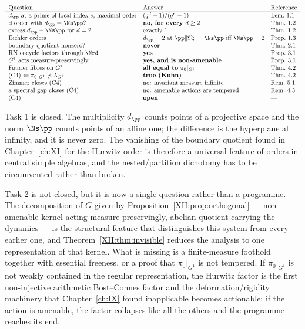 \[
\begin{array}{lll}
\text{Question} & \text{Answer} & \text{Reference}\\\hline
d_\pp\ \text{at a prime of local index }e\text{, maximal order} & (q^d-1)/(q^e-1) & \text{Lem.~1.1}\\
\exists\ \text{order with}\ d_\pp=\Ns\pp? & \textbf{no, for every }d\ge2 & \text{Thm.~1.2}\\
\text{excess}\ d_\pp-\Ns\pp\ \text{for}\ d=2 & \text{exactly }1 & \text{Thm.~1.2}\\
\text{Eichler orders} & d_\pp=2\ \text{at}\ \pp\|\mathfrak N;\ =\Ns\pp\ \text{iff}\ \Ns\pp=2 & \text{Prop.~1.3}\\
\text{boundary quotient nonzero?} & \textbf{never} & \text{Thm.~2.1}\\
\text{RN cocycle factors through}\ \Nrd & \textbf{yes} & \text{Prop.~3.1}\\
G^1\ \text{acts measure-preservingly} & \textbf{yes, and is non-amenable} & \text{Prop.~3.1}\\
\text{Fourier fibres on}\ G^1 & \textbf{all equal to}\ \pi_0|_{G^1} & \text{Thm.~4.2}\\
\text{(C4)}\Leftarrow\pi_0|_{G^1}\not\prec\lambda_{G^1} & \textbf{true (Kuhn)} & \text{Thm.~4.2}\\
\text{Zimmer closes (C4)} & \text{no: invariant measure infinite} & \text{Rem.~5.1}\\
\text{a spectral gap closes (C4)} & \text{no: amenable actions are tempered} & \text{Rem.~4.3}\\
\text{(C4)} & \textbf{open} & \text{---}
\end{array}
\]

Task 1 is closed. The multiplicity $d_\pp$ counts points of a projective space and the norm
$\Ns\pp$ counts points of an affine one; the difference is the hyperplane at infinity, and it
is never zero. The vanishing of the boundary quotient found in Chapter~\ref{ch:XI} for the Hurwitz
order is therefore a universal feature of orders in central simple algebras, and
the nested/partition dichotomy has to be circumvented rather than broken.

Task 2 is not closed, but it is now a single question rather than a programme. The
decomposition of $G$ given by Proposition~\ref{XII:prop:orthogonal} --- non-amenable kernel acting
measure-preservingly, abelian quotient carrying the dynamics --- is the structural feature
that distinguishes this system from every earlier one, and Theorem~\ref{XII:thm:invisible} reduces
the analysis to one representation of that kernel. What is missing is a finite-measure
foothold together with essential freeness, or a proof that $\pi_0|_{G^1}$ is not tempered. If
$\pi_0|_{G^1}$ is not weakly contained in the regular representation, the Hurwitz factor is
the first non-injective arithmetic Bost--Connes factor and the deformation/rigidity machinery
that Chapter~\ref{ch:IX} found inapplicable becomes actionable; if the action is amenable, the factor
collapses like all the others and the programme reaches its end.


